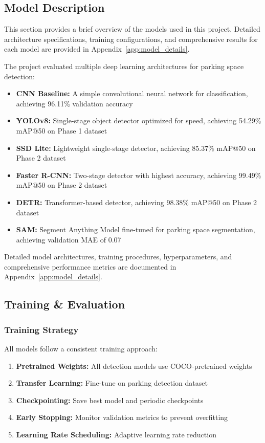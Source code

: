 \documentclass[12pt,a4paper]{article}
\begin{document}
\subsection{Model Description}

This section provides a brief overview of the models used in this project. Detailed architecture specifications, training configurations, and comprehensive results for each model are provided in Appendix~\ref{app:model_details}.

The project evaluated multiple deep learning architectures for parking space detection:
\begin{itemize}
    \item \textbf{CNN Baseline:} A simple convolutional neural network for classification, achieving 96.11\% validation accuracy
    \item \textbf{YOLOv8:} Single-stage object detector optimized for speed, achieving 54.29\% mAP@50 on Phase 1 dataset
    \item \textbf{SSD Lite:} Lightweight single-stage detector, achieving 85.37\% mAP@50 on Phase 2 dataset
    \item \textbf{Faster R-CNN:} Two-stage detector with highest accuracy, achieving 99.49\% mAP@50 on Phase 2 dataset
    \item \textbf{DETR:} Transformer-based detector, achieving 98.38\% mAP@50 on Phase 2 dataset
    \item \textbf{SAM:} Segment Anything Model fine-tuned for parking space segmentation, achieving validation MAE of 0.07
\end{itemize}

Detailed model architectures, training procedures, hyperparameters, and comprehensive performance metrics are documented in Appendix~\ref{app:model_details}.

\subsection{Training \& Evaluation}

\subsubsection{Training Strategy}

All models follow a consistent training approach:
\begin{enumerate}
    \item \textbf{Pretrained Weights:} All detection models use COCO-pretrained weights
    \item \textbf{Transfer Learning:} Fine-tune on parking detection dataset
    \item \textbf{Checkpointing:} Save best model and periodic checkpoints
    \item \textbf{Early Stopping:} Monitor validation metrics to prevent overfitting
    \item \textbf{Learning Rate Scheduling:} Adaptive learning rate reduction
\end{enumerate}
\end{document}
